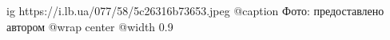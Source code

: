  
 
 
 
 

\ifcmt
  ig https://i.lb.ua/077/58/5c26316b73653.jpeg
	@caption Фото: предоставлено автором
  @wrap center
  @width 0.9
\fi
